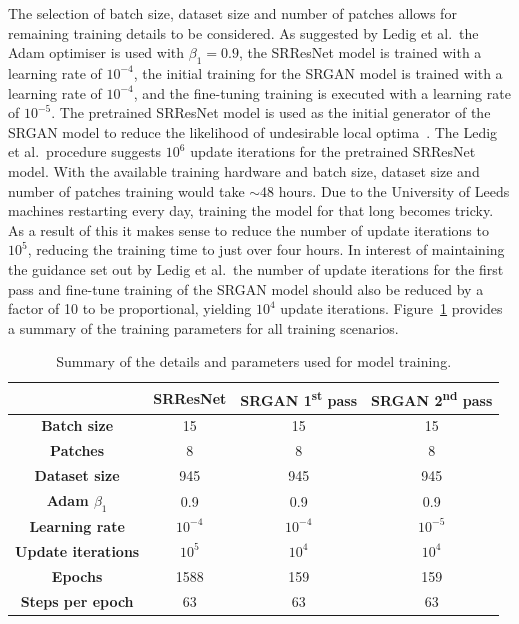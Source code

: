 The selection of batch size, dataset size and number of patches allows for remaining training details to be considered. As suggested by Ledig et al.\ the Adam optimiser is used with $\beta_1 = 0.9$, the SRResNet model is trained with a learning rate of $10^{-4}$, the initial training for the SRGAN model is trained with a learning rate of $10^{-4}$, and the fine-tuning training is executed with a learning rate of $10^{-5}$. The pretrained SRResNet model is used as the initial generator of the SRGAN model to reduce the likelihood of undesirable local optima~\cite{srgan}. The Ledig et al.\ procedure suggests $10^6$ update iterations for the pretrained SRResNet model. With the available training hardware and batch size, dataset size and number of patches training would take $\sim$48 hours. Due to the University of Leeds machines restarting every day, training the model for that long becomes tricky. As a result of this it makes sense to reduce the number of update iterations to $10^{5}$, reducing the training time to just over four hours. In interest of maintaining the guidance set out by Ledig et al.\ the number of update iterations for the first pass and fine-tune training of the SRGAN model should also be reduced by a factor of 10 to be proportional, yielding $10^4$ update iterations. Figure~\ref{table:model_training} provides a summary of the training parameters for all training scenarios.
\begin{table}
    \centering
    \begin{tabular}{cccc}
        \toprule
        {} & \textbf{SRResNet} & \textbf{SRGAN 1\textsuperscript{st} pass} & \textbf{SRGAN 2\textsuperscript{nd} pass} \\
        \midrule
        \textbf{Batch size} & 15 & 15 & 15\\ 
        \textbf{Patches} & 8 & 8 & 8 \\
        \textbf{Dataset size} & 945 & 945 & 945\\
        \textbf{Adam $\beta_1$} & 0.9 & 0.9 & 0.9\\
        \textbf{Learning rate} & $10^{-4}$ & $10^{-4}$ & $10^{-5}$ \\
        \textbf{Update iterations} & $10^5$ & $10^4$ & $10^4$ \\
        \textbf{Epochs} & 1588 & 159 & 159 \\
        \textbf{Steps per epoch} & 63 & 63 & 63 \\
        \bottomrule
    \end{tabular}
    \caption{Summary of the details and parameters used for model training.}
    \label{table:model_training}
\end{table}

